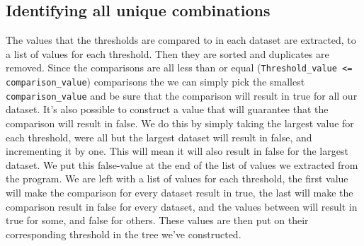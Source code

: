 \subsection{Identifying all unique combinations}
The values that the thresholds are compared to in each dataset are extracted,
to a list of values for each threshold. Then they are sorted and duplicates are
removed. Since the comparisons are all less than or equal
(\texttt{Threshold\_value <= comparison\_value}) comparisons the we can simply
pick the smallest \texttt{comparison\_value} and be sure that the comparison
will result in true for all our dataset. It's also possible to construct a
value that will guarantee that the comparison will result in false. We do this
by simply taking the largest value for each threshold, were all but the largest
dataset will result in false, and incrementing it by one. This will mean it
will also result in false for the largest dataset. We put this false-value at
the end of the list of values we extracted from the program. We are left with a
list of values for each threshold, the first value will make the comparison for
every dataset result in true, the last will make the comparison result in false
for every dataset, and the values between will result in true for some, and
false for others. These values are then put on their corresponding threshold in
the tree we've constructed.
\\


